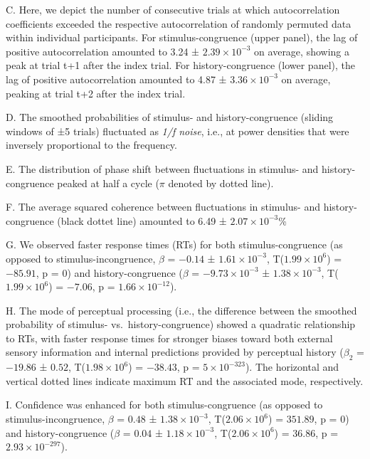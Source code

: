 \documentclass[
]{article}
\begin{document}
C. Here, we depict the number of consecutive trials at which
autocorrelation coefficients exceeded the respective autocorrelation of
randomly permuted data within individual participants. For
stimulus-congruence (upper panel), the lag of positive autocorrelation
amounted to 3.24 ± \ensuremath{2.39\times 10^{-3}} on average, showing a
peak at trial t+1 after the index trial. For history-congruence (lower
panel), the lag of positive autocorrelation amounted to 4.87 ±
\ensuremath{3.36\times 10^{-3}} on average, peaking at trial t+2 after
the index trial.

D. The smoothed probabilities of stimulus- and history-congruence
(sliding windows of ±5 trials) fluctuated as \emph{1/f noise}, i.e., at
power densities that were inversely proportional to the frequency.

E. The distribution of phase shift between fluctuations in stimulus- and
history-congruence peaked at half a cycle (\(\pi\) denoted by dotted
line).

F. The average squared coherence between fluctuations in stimulus- and
history-congruence (black dottet line) amounted to 6.49 ±
\ensuremath{2.07\times 10^{-3}}\%

G. We observed faster response times (RTs) for both stimulus-congruence
(as opposed to stimulus-incongruence, \(\beta\) = \(-0.14\) ±
\(\ensuremath{1.61\times 10^{-3}}\),
T(\(\ensuremath{1.99\times 10^{6}}\)) = \(-85.91\), p = \(0\)) and
history-congruence (\(\beta\) = \(\ensuremath{-9.73\times 10^{-3}}\) ±
\(\ensuremath{1.38\times 10^{-3}}\),
T(\(\ensuremath{1.99\times 10^{6}}\)) = \(-7.06\), p =
\(\ensuremath{1.66\times 10^{-12}}\)).

H. The mode of perceptual processing (i.e., the difference between the
smoothed probability of stimulus- vs.~history-congruence) showed a
quadratic relationship to RTs, with faster response times for stronger
biases toward both external sensory information and internal predictions
provided by perceptual history (\(\beta_2\) = \(-19.86\) ± \(0.52\),
T(\(\ensuremath{1.98\times 10^{6}}\)) = \(-38.43\), p =
\(\ensuremath{5\times 10^{-323}}\)). The horizontal and vertical dotted
lines indicate maximum RT and the associated mode, respectively.

I. Confidence was enhanced for both stimulus-congruence (as opposed to
stimulus-incongruence, \(\beta\) = \(0.48\) ±
\(\ensuremath{1.38\times 10^{-3}}\),
T(\(\ensuremath{2.06\times 10^{6}}\)) = \(351.89\), p = \(0\)) and
history-congruence (\(\beta\) = \(0.04\) ±
\(\ensuremath{1.18\times 10^{-3}}\),
T(\(\ensuremath{2.06\times 10^{6}}\)) = \(36.86\), p =
\(\ensuremath{2.93\times 10^{-297}}\)).
\end{document}
